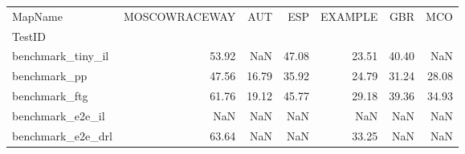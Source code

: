 \begin{tabular}{lrrrrrr}
\toprule
MapName & MOSCOWRACEWAY & AUT & ESP & EXAMPLE & GBR & MCO \\
TestID &  &  &  &  &  &  \\
\midrule
benchmark_tiny_il & 53.92 & NaN & 47.08 & 23.51 & 40.40 & NaN \\
benchmark_pp & 47.56 & 16.79 & 35.92 & 24.79 & 31.24 & 28.08 \\
benchmark_ftg & 61.76 & 19.12 & 45.77 & 29.18 & 39.36 & 34.93 \\
benchmark_e2e_il & NaN & NaN & NaN & NaN & NaN & NaN \\
benchmark_e2e_drl & 63.64 & NaN & NaN & 33.25 & NaN & NaN \\
\bottomrule
\end{tabular}
